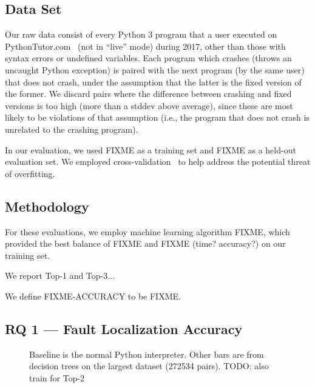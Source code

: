\documentclass[conference]{IEEEtran}
\begin{document}
\subsection{Data Set}

Our raw data consist of every Python 3 program that a user executed on
PythonTutor.com~\cite{Guo2013-vu} (not in ``live'' mode) during 2017, other
than those with syntax errors or undefined variables.  Each program which
crashes (throws an uncaught Python exception) is paired with the next
program (by the same user) that does not crash, under the assumption that
the latter is the fixed version of the former. We discard pairs where the
difference between crashing and fixed versions is too high (more than a
stddev above average), since these are most likely to be violations of that
assumption (i.e., the program that does not crash is unrelated to the
crashing program).

In our evaluation, we used FIXME as a training set and FIXME as a held-out
evaluation set. We employed cross-validation~\cite{kohavi} to help address
the potential threat of overfitting.

\subsection{Methodology}

For these evaluations, we employ machine learning algorithm FIXME, which
provided the best balance of FIXME and FIXME (time? accuracy?) on our
training set.

We report Top-1 and Top-3...

We define FIXME-ACCURACY to be FIXME.

\subsection{RQ 1 --- Fault Localization Accuracy}

\begin{figure}
\caption{Baseline is the normal Python interpreter. Other bars are from decision
trees on the largest dataset (272534 pairs). TODO: also train for Top-2}
\label{fig:full-dataset-acc}
\end{figure}
\end{document}
